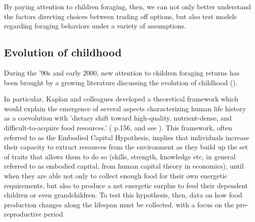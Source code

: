 By paying attention to children foraging, then, we can not only better understand the factors directing choices between trading off options, but also test models regarding foraging behaviors under a variety of assumptions.

\subsection{Evolution of childhood}
During the '90s and early 2000, new attention to children foraging returns has been brought by a growing literature discussing the evolution of childhood (\cite{bogin_evolutionary_1997}).%

In particular, Kaplan and colleagues developed a theoretical framework which would explain the emergence of several aspects characterizing human life history as a coevolution with 'dietary shift toward high-quality, nutrient-dense, and difficult-to-acquire food resources.' (\cite{kaplan_theory_2000} p.156, and see \cite{kaplan_theory_1996, kaplan_evolution_1997, kaplan_embodied_2001, kaplan_emergence_2002, kaplan_embodied_2003, kaplan_neural_2003, kaplan_life_2006, kaplan_evolution_2007}). %
This framework, often referred to as the Embodied Capital Hypothesis, implies that individuals increase their capacity to extract resources from the environment as they build up the set of traits that allows them to do so (skills, strength, knowledge etc, in general referred to as embodied capital, from human capital theory in economics), until when they are able not only to collect enough food for their own energetic requirements, but also to produce a net energetic surplus to feed their dependent children or even grandchildren. To test this hypothesis, then, data on how food production changes along the lifespan must be collected, with a focus on the pre-reproductive period.

